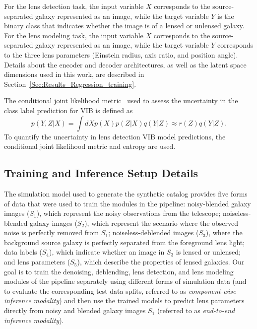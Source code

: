 \documentclass[12pt, twocolumn, apj]{openjournal}
\begin{document}
For the lens detection task, the input variable $X$ corresponds to the source-separated galaxy represented as an image, while the target variable $Y$ is the binary class that indicates whether the image is of a lensed or unlensed galaxy. For the lens modeling task, the input variable $X$ corresponds to the source-separated galaxy represented as an image, while the target variable $Y$ corresponds to the three lens parameters (Einstein radius, axis ratio, and position angle). Details about the encoder and decoder architectures, as well as the latent space dimensions used in this work, are described in Section~\ref{Sec:Results_Regression_training}.

The conditional joint likelihood metric~\citep{alemi2018uncertainty} used to assess the uncertainty in the class label prediction for VIB is defined as 
\begin{equation*}
   p(Y,Z|X) = \int {d}X p(X)p(Z|X)q(Y|Z) \approx r(Z)q(Y|Z).
\end{equation*}
To quantify the uncertainty in lens detection VIB model predictions, the conditional joint likelihood metric and entropy are used. 

\subsection{Training and Inference Setup Details}

The simulation model used to generate the synthetic catalog  
provides five forms of data that were used to train the modules in the pipeline: noisy-blended galaxy images ($S_1$), which represent the noisy observations from the telescope; noiseless-blended galaxy images ($S_2$), which represent the scenario where the observed noise is perfectly removed from $S_1$; noiseless-deblended images ($S_3$), where the background source galaxy is perfectly separated from the foreground lens light; data labels ($S_4$), which indicate whether an image in $S_3$ is lensed or unlensed; and lens parameters ($S_5$), which describe the properties of lensed galaxies.  
Our goal is to train the denoising, deblending, lens detection, and lens modeling modules of the pipeline separately using different forms of simulation data (and to evaluate the corresponding test data splits, referred to as {\em component-wise inference modality}) and then use the trained models to predict lens parameters directly from noisy and blended galaxy images $S_1$ (referred to as {\em end-to-end inference modality}). 
\end{document}
